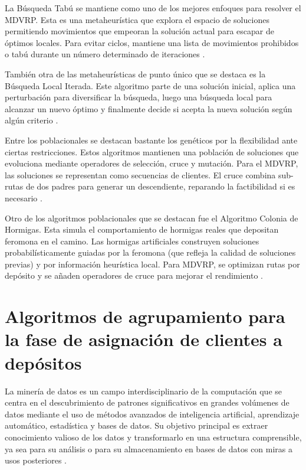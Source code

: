 La Búsqueda Tabú se mantiene como uno de los mejores enfoques para resolver el MDVRP. Esta es una metaheurística que explora el espacio de soluciones permitiendo movimientos que empeoran la solución actual para escapar de óptimos locales. Para evitar ciclos, mantiene una lista de movimientos prohibidos o tabú durante un número determinado de iteraciones  \parencite{hernandezAPLICACIONMODELOVRP2015}.

También otra de las metaheurísticas de punto único que se destaca es la Búsqueda Local Iterada. Este algoritmo parte de una solución inicial, aplica una perturbación para diversificar la búsqueda, luego una búsqueda local para alcanzar un nuevo óptimo y finalmente decide si acepta la nueva solución según algún criterio \parencite{colinDisenoAlgoritmoMetaheuristico2024}.

Entre los poblacionales se destacan bastante los genéticos por la flexibilidad ante ciertas restricciones. Estos algoritmos mantienen una población de soluciones que evoluciona mediante operadores de selección, cruce y mutación. Para el MDVRP, las soluciones se representan como secuencias de clientes. El cruce combina sub-rutas de dos padres para generar un descendiente, reparando la factibilidad si es necesario \parencite{hernandezAPLICACIONMODELOVRP2015}.

Otro de los algoritmos poblacionales que se destacan fue el Algoritmo Colonia de Hormigas. Esta simula el comportamiento de hormigas reales que depositan feromona en el camino. Las hormigas artificiales construyen soluciones probabilísticamente guiadas por la feromona (que refleja la calidad de soluciones previas) y por información heurística local. Para MDVRP, se optimizan rutas por depósito y se a\~naden operadores de cruce para mejorar el rendimiento \parencite{colinDisenoAlgoritmoMetaheuristico2024}.

\section{Algoritmos de agrupamiento para la fase de asignación de clientes a depósitos}

La minería de datos es un campo interdisciplinario de la computación que se centra en el descubrimiento de patrones significativos en grandes volúmenes de datos mediante el uso de métodos avanzados de inteligencia artificial, aprendizaje automático, estadística y bases de datos. Su objetivo principal es extraer conocimiento valioso de los datos y transformarlo en una estructura comprensible, ya sea para su análisis o para su almacenamiento en bases de datos con miras a usos posteriores \parencite{oralloIntroduccionMineriaDatos2004}.

